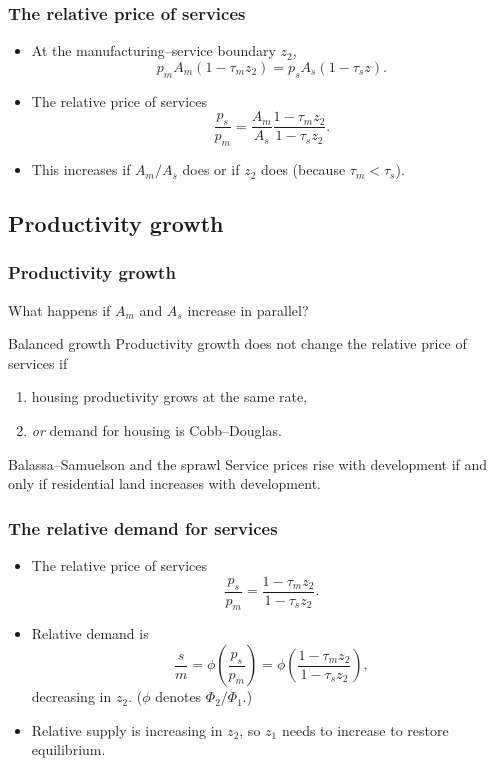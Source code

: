 \documentclass[handout,compress,mathserif]{beamer}
\begin{document}
\begin{frame}\frametitle{The relative price of services}
\begin{itemize}
    \item At the manufacturing--service boundary $z_2$,
    \[
    p_mA_m(1-\tau_m z_2) = p_sA_s(1-\tau_s z).
    \]
    \item The relative price of services
    \[
    \frac{p_s}{p_m} = \frac{A_m}{A_s}\frac{1-\tau_m z_2}{1-\tau_s z_2}.
    \]
    \item This increases if $A_m/A_s$ does or if $z_2$ does (because $\tau_m<\tau_s$).
\end{itemize}
\end{frame}

\subsection{Productivity growth}


\begin{frame}\frametitle{Productivity growth}
What happens if  $A_m$ and $A_s$ increase in parallel?
\begin{block}{Balanced growth}
Productivity growth does not change the relative price of services if
    \begin{enumerate}
      \item housing productivity grows at the same rate,
      \item \emph{or} demand for housing is Cobb--Douglas.
    \end{enumerate}
\end{block}
\pause
\begin{block}{Balassa--Samuelson and the sprawl}
Service prices rise with development if and only if residential land increases with development.
\end{block}
\end{frame}



\begin{frame}\frametitle{The relative demand for services}
\begin{itemize}
    \item The relative price of services
    \[
    \frac{p_s}{p_m} = \frac{1-\tau_m z_2}{1-\tau_s z_2}.
    \]
    \item Relative demand is
    \[
    \frac{s}{m} = \phi\left(\frac{p_s}{p_m}\right) = \phi\left(\frac{1-\tau_m z_2}{1-\tau_s z_2}\right),
    \]
    decreasing in $z_2$. ($\phi$ denotes $\Phi_2/\Phi_1$.)
    \item Relative supply is increasing in $z_2$, so $z_1$ needs to increase to restore equilibrium.
\end{itemize}
\end{frame}
\end{document}
